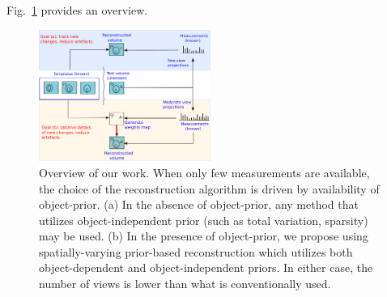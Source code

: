 \documentclass[journal]{IEEEtran}
\begin{document}
Fig.~\ref{fig:prior_overview} provides an overview.


 \begin{figure}[h]
\centering
	\includegraphics[width=0.5\textwidth]{../images/prior_cmb.png}
        \caption{Overview of our work. When only few measurements are available, the choice of the reconstruction algorithm is driven by availability of object-prior.  (a) In the absence of object-prior, any method that utilizes object-independent prior (such as total variation, sparsity) may be used. (b) In the presence of object-prior, we propose using spatially-varying prior-based reconstruction which utilizes both object-dependent and object-independent priors. In either case, the number of views is lower than what is conventionally used.}
 \label{fig:prior_overview}
\end{figure}
\end{document}
